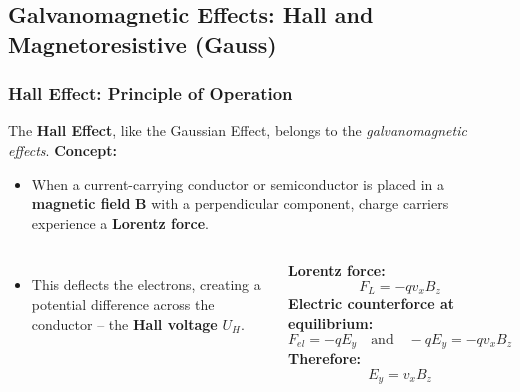 

\subsection{Galvanomagnetic Effects: Hall and Magnetoresistive (Gauss)}

\begin{frame}
	\frametitle{Hall Effect: Principle of Operation}
    \small
    The \textbf{Hall Effect}, like the Gaussian Effect, belongs to the \textit{galvanomagnetic effects}.
    \textbf{Concept:}
    \begin{itemize}
        \item When a current-carrying conductor or semiconductor is placed in a \textbf{magnetic field} $\mathbf{B}$ with a perpendicular component, charge carriers experience a \textbf{Lorentz force}.
    \end{itemize}
    \begin{columns}
            \vspace{-0.5cm}
            \begin{itemize}
                \item This deflects the electrons, creating a potential difference across the conductor -- the \textbf{Hall voltage} $U_H$.
            \end{itemize}
            \textbf{Lorentz force:}
            \vspace{-0.5cm}
            \begin{equation}
                F_L = -q v_x B_z
            \end{equation}
            \textbf{Electric counterforce at equilibrium:}
            \begin{equation}
                F_{el} = -q E_y \quad \text{and} \quad -q E_y = -q v_x B_z
            \end{equation}
            \textbf{Therefore:}
            \begin{equation}
                E_y = v_x B_z
            \end{equation}

\end{columns}
\end{frame}

